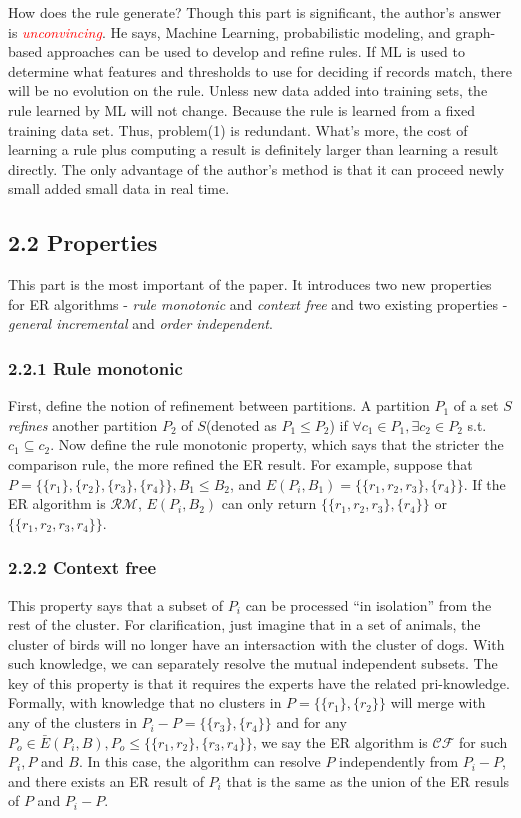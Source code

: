 \documentclass[12pt,a4paper]{report}
\begin{document}
How does the rule generate? Though this part is significant, the author's answer is \textcolor{red}{\emph{unconvincing}}. He says, Machine Learning, probabilistic modeling, and graph-based approaches can be used to develop and refine rules. If ML is used to determine what features and thresholds to use for deciding if records match, there will be no evolution on the rule. Unless new data added into training sets, the rule learned by ML will not change. Because the rule is learned from a fixed training data set. Thus, problem(1) is redundant. What's more, the cost of learning a rule plus computing a result is definitely larger than learning a result directly. The only advantage of the author's method is that it can proceed newly small added small data in real time. 

\subsection*{2.2 Properties}
This part is the most important of the paper. It introduces two new properties for ER algorithms - \emph{rule monotonic} and \emph{context free} and two existing properties - \emph{general incremental} and \emph{order independent}.
\subsubsection*{2.2.1 Rule monotonic}
First, define the notion of refinement between partitions. A partition $P_{1}$ of a set $S$ \emph{refines} another partition $P_{2}$ of $S$(denoted as $P_{1} \leq P_{2}$) if $\forall c_{1} \in P_{1}, \exists c_{2} \in P_{2}$ s.t. $c_{1}\subseteq c_{2}$. Now define the rule monotonic property, which says that the stricter the comparison rule, the more refined the ER result. For example, suppose that $P=\{\{r_{1}\}, \{r_{2}\}, \{r_{3}\}, \{r_{4}\}\}, B_{1}\leq B_{2}$, and $E(P_{i},B_{1})=\{\{r_{1},r_{2},r_{3}\}, \{r_{4}\}\}$. If the ER algorithm is $\mathcal{RM}$, $E(P_{i},B_{2})$ can only return $\{\{r_{1},r_{2},r_{3}\}, \{r_{4}\}\}$ or $\{\{r_{1},r_{2},r_{3},r_{4}\}\}$.
\subsubsection*{2.2.2 Context free}
This property says that a subset of $P_{i}$ can be processed ``in isolation'' from the rest of the cluster. For clarification, just imagine that in a set of animals, the cluster of birds will no longer have an intersaction with the cluster of dogs. With such knowledge, we can separately resolve the mutual independent subsets. The key of this property is that it requires the experts have the related pri-knowledge. Formally, with knowledge that no clusters in $P=\{\{r_{1}\}, \{r_{2}\}\}$ will merge with any of the clusters in $P_{i}-P=\{\{r_{3}\},\{r_{4}\}\}$ and for any $P_{o}\in \bar{E}(P_{i},B), P_{o}\leq \{\{r_{1},r_{2}\},\{r_{3}, r_{4}\}\}$, we say the ER algorithm is $\mathcal{CF}$ for such $P_{i}, P$ and $B$. In this case, the algorithm can resolve $P$ independently from $P_{i}-P$, and there exists an ER result of $P_{i}$ that is the same as the union of the ER resuls of $P$ and $P_{i}-P$.
\end{document}
